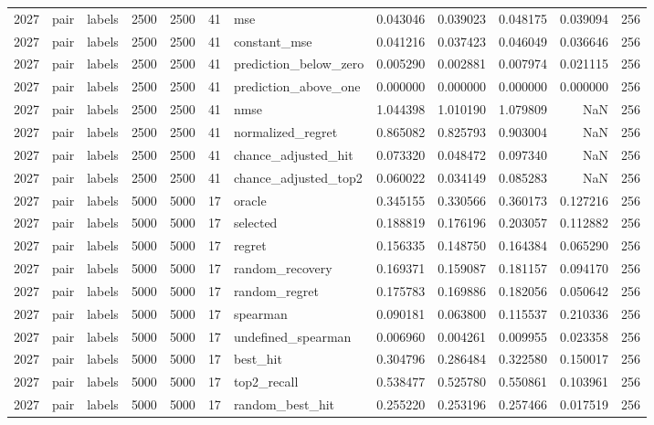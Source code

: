 \begin{tabular}{rllrrrlrrrrr}
2027 & pair & labels & 2500 & 2500 & 41 & mse & 0.043046 & 0.039023 & 0.048175 & 0.039094 & 256 \\
2027 & pair & labels & 2500 & 2500 & 41 & constant_mse & 0.041216 & 0.037423 & 0.046049 & 0.036646 & 256 \\
2027 & pair & labels & 2500 & 2500 & 41 & prediction_below_zero & 0.005290 & 0.002881 & 0.007974 & 0.021115 & 256 \\
2027 & pair & labels & 2500 & 2500 & 41 & prediction_above_one & 0.000000 & 0.000000 & 0.000000 & 0.000000 & 256 \\
2027 & pair & labels & 2500 & 2500 & 41 & nmse & 1.044398 & 1.010190 & 1.079809 & NaN & 256 \\
2027 & pair & labels & 2500 & 2500 & 41 & normalized_regret & 0.865082 & 0.825793 & 0.903004 & NaN & 256 \\
2027 & pair & labels & 2500 & 2500 & 41 & chance_adjusted_hit & 0.073320 & 0.048472 & 0.097340 & NaN & 256 \\
2027 & pair & labels & 2500 & 2500 & 41 & chance_adjusted_top2 & 0.060022 & 0.034149 & 0.085283 & NaN & 256 \\
2027 & pair & labels & 5000 & 5000 & 17 & oracle & 0.345155 & 0.330566 & 0.360173 & 0.127216 & 256 \\
2027 & pair & labels & 5000 & 5000 & 17 & selected & 0.188819 & 0.176196 & 0.203057 & 0.112882 & 256 \\
2027 & pair & labels & 5000 & 5000 & 17 & regret & 0.156335 & 0.148750 & 0.164384 & 0.065290 & 256 \\
2027 & pair & labels & 5000 & 5000 & 17 & random_recovery & 0.169371 & 0.159087 & 0.181157 & 0.094170 & 256 \\
2027 & pair & labels & 5000 & 5000 & 17 & random_regret & 0.175783 & 0.169886 & 0.182056 & 0.050642 & 256 \\
2027 & pair & labels & 5000 & 5000 & 17 & spearman & 0.090181 & 0.063800 & 0.115537 & 0.210336 & 256 \\
2027 & pair & labels & 5000 & 5000 & 17 & undefined_spearman & 0.006960 & 0.004261 & 0.009955 & 0.023358 & 256 \\
2027 & pair & labels & 5000 & 5000 & 17 & best_hit & 0.304796 & 0.286484 & 0.322580 & 0.150017 & 256 \\
2027 & pair & labels & 5000 & 5000 & 17 & top2_recall & 0.538477 & 0.525780 & 0.550861 & 0.103961 & 256 \\
2027 & pair & labels & 5000 & 5000 & 17 & random_best_hit & 0.255220 & 0.253196 & 0.257466 & 0.017519 & 256 \\

\end{tabular}
